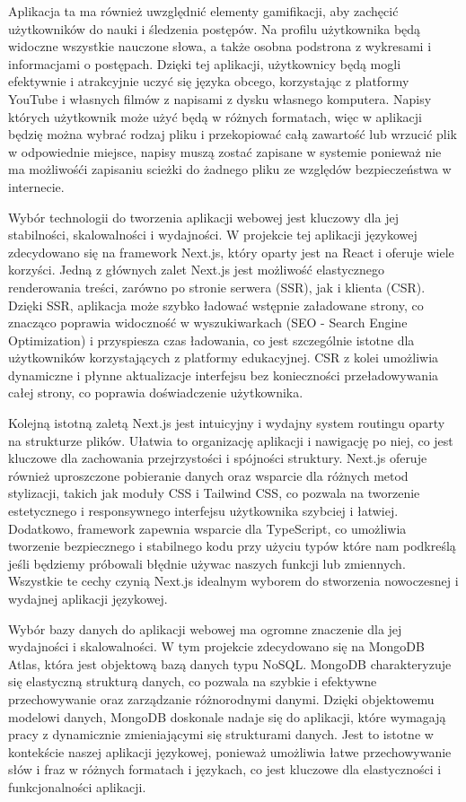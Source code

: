 Aplikacja ta ma również uwzględnić elementy gamifikacji, aby zachęcić użytkowników do nauki i śledzenia postępów. Na profilu użytkownika będą widoczne wszystkie nauczone słowa, a także osobna podstrona z wykresami i informacjami o postępach. Dzięki tej aplikacji, użytkownicy będą mogli efektywnie i atrakcyjnie uczyć się języka obcego, korzystając z platformy YouTube i własnych filmów z napisami z dysku własnego komputera. Napisy których użytkownik może użyć będą w różnych formatach, więc w aplikacji będzię można wybrać rodzaj pliku i przekopiować całą zawartość lub wrzucić plik w odpowiednie miejsce, napisy muszą zostać zapisane w systemie ponieważ nie ma możliwośći zapisaniu scieżki do żadnego pliku ze względów bezpieczeństwa w internecie.  

Wybór technologii do tworzenia aplikacji webowej jest kluczowy dla jej stabilności, skalowalności i wydajności. W projekcie tej aplikacji językowej zdecydowano się na framework Next.js, który oparty jest na React i oferuje wiele korzyści. Jedną z głównych zalet Next.js jest możliwość elastycznego renderowania treści, zarówno po stronie serwera (SSR), jak i klienta (CSR). Dzięki SSR, aplikacja może szybko ładować wstępnie załadowane strony, co znacząco poprawia widoczność w wyszukiwarkach (SEO - Search Engine Optimization) i przyspiesza czas ładowania, co jest szczególnie istotne dla użytkowników korzystających z platformy edukacyjnej. CSR z kolei umożliwia dynamiczne i płynne aktualizacje interfejsu bez konieczności przeładowywania całej strony, co poprawia doświadczenie użytkownika. 

Kolejną istotną zaletą Next.js jest intuicyjny i wydajny system routingu oparty na strukturze plików. Ułatwia to organizację aplikacji i nawigację po niej, co jest kluczowe dla zachowania przejrzystości i spójności struktury. Next.js oferuje również uproszczone pobieranie danych oraz wsparcie dla różnych metod stylizacji, takich jak moduły CSS i Tailwind CSS, co pozwala na tworzenie estetycznego i responsywnego interfejsu użytkownika szybciej i łatwiej. Dodatkowo, framework zapewnia wsparcie dla TypeScript, co umożliwia tworzenie bezpiecznego i stabilnego kodu przy użyciu typów które nam podkreślą jeśli będziemy próbowali błędnie używac naszych funkcji lub zmiennych. Wszystkie te cechy czynią Next.js idealnym wyborem do stworzenia nowoczesnej i wydajnej aplikacji językowej. 

Wybór bazy danych do aplikacji webowej ma ogromne znaczenie dla jej wydajności i skalowalności. W tym projekcie zdecydowano się na MongoDB Atlas, która jest objektową bazą danych typu NoSQL. MongoDB charakteryzuje się elastyczną strukturą danych, co pozwala na szybkie i efektywne przechowywanie oraz zarządzanie różnorodnymi danymi. Dzięki objektowemu modelowi danych, MongoDB doskonale nadaje się do aplikacji, które wymagają pracy z dynamicznie zmieniającymi się strukturami danych. Jest to istotne w kontekście naszej aplikacji językowej, ponieważ umożliwia łatwe przechowywanie słów i fraz w różnych formatach i językach, co jest kluczowe dla elastyczności i funkcjonalności aplikacji. 

